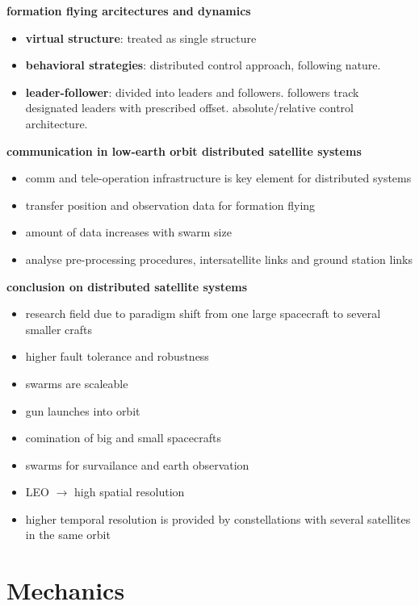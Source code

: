 \documentclass[a4paper,10pt]{article}
\newcommand{\f}{\textbf}
\begin{document}
\f{formation flying arcitectures and dynamics}
\begin{itemize}
 \item \f{virtual structure}: treated as single structure
 \item \f{behavioral strategies}: distributed control approach, following nature.
 \item \f{leader-follower}: divided into leaders and followers. followers track designated leaders with prescribed offset. absolute/relative control architecture.
\end{itemize}

\f{communication in low-earth orbit distributed satellite systems}
\begin{itemize}
 \item comm and tele-operation infrastructure is key element for distributed systems
 \item transfer position and observation data for formation flying
 \item amount of data increases with swarm size
 \item analyse pre-processing procedures, intersatellite links and ground station links
\end{itemize}

\f{conclusion on distributed satellite systems}
\begin{itemize}
 \item research field due to paradigm shift from one large spacecraft to several smaller crafts
 \item higher fault tolerance and robustness
 \item swarms are scaleable
 \item gun launches into orbit
 \item comination of big and small spacecrafts
 \item swarms for survailance and earth observation
 \item LEO $\rightarrow$ high spatial resolution
 \item higher temporal resolution is provided by constellations with several satellites in the same orbit
\end{itemize}








\section{Mechanics}
\end{document}
